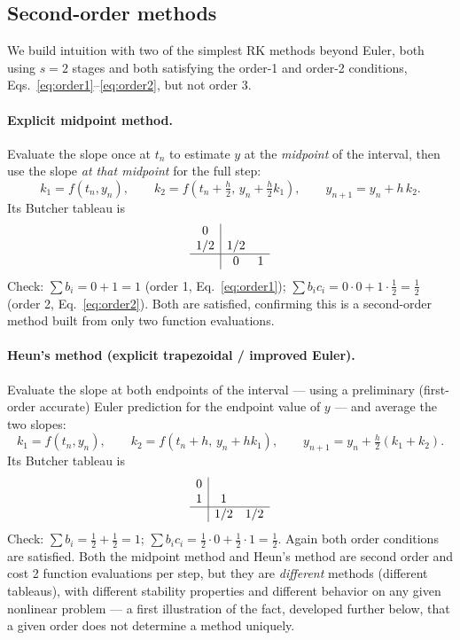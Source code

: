 \subsection{Second-order methods}

We build intuition with two of the simplest RK methods beyond Euler, both using $s=2$ stages and both satisfying the order-1 and order-2 conditions, Eqs.~\eqref{eq:order1}--\eqref{eq:order2}, but not order 3.

\paragraph{Explicit midpoint method.} Evaluate the slope once at $t_n$ to estimate $y$ at the \emph{midpoint} of the interval, then use the slope \emph{at that midpoint} for the full step:
\begin{equation}
k_1 = f(t_n, y_n), \qquad k_2 = f\!\left(t_n+\tfrac{h}{2},\, y_n + \tfrac{h}{2}k_1\right), \qquad y_{n+1} = y_n + h\,k_2.
\end{equation}
Its Butcher tableau is
\begin{equation}
\begin{array}{c|cc}
0 & & \\
1/2 & 1/2 & \\ \hline
 & 0 & 1
\end{array}
\end{equation}
Check: $\sum b_i = 0+1=1$ (order 1, Eq.~\eqref{eq:order1}); $\sum b_i c_i = 0\cdot 0 + 1\cdot\tfrac12 = \tfrac12$ (order 2, Eq.~\eqref{eq:order2}). Both are satisfied, confirming this is a second-order method built from only two function evaluations.

\paragraph{Heun's method (explicit trapezoidal / improved Euler).} Evaluate the slope at both endpoints of the interval --- using a preliminary (first-order accurate) Euler prediction for the endpoint value of $y$ --- and average the two slopes:
\begin{equation}
k_1 = f(t_n, y_n), \qquad k_2 = f(t_n + h,\, y_n + h k_1), \qquad y_{n+1} = y_n + \tfrac{h}{2}(k_1 + k_2).
\end{equation}
Its Butcher tableau is
\begin{equation}
\begin{array}{c|cc}
0 & & \\
1 & 1 & \\ \hline
 & 1/2 & 1/2
\end{array}
\end{equation}
Check: $\sum b_i = \tfrac12+\tfrac12=1$; $\sum b_i c_i = \tfrac12\cdot 0 + \tfrac12\cdot 1 = \tfrac12$. Again both order conditions are satisfied. Both the midpoint method and Heun's method are second order and cost 2 function evaluations per step, but they are \emph{different} methods (different tableaus), with different stability properties and different behavior on any given nonlinear problem --- a first illustration of the fact, developed further below, that a given order does not determine a method uniquely.

